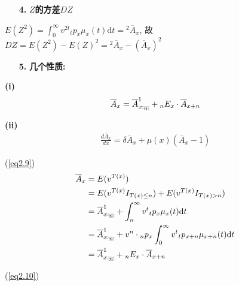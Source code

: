 \documentclass[a4paper,10pt]{ctexbook}
\makeatletter
\newcommand{\hei}{\CJKfamily{hei}}      %
\DeclareRobustCommand{\annu}[1]{_{%
    \def\arraystretch{0}%
    \setlength\arraycolsep{1pt}%
    \setlength\arrayrulewidth{.2pt}%
    \begin{array}[b]{@{}c|}\hline
        \\[\arraycolsep]%
        \scriptstyle #1%
    \end{array}%
}}
\makeatother
\begin{document}
\begin{itemize}
    \item[{\bf\hei 4.}]{\bf\hei $Z$的方差$DZ$}
\end{itemize}

$E(Z^2) = \int_0^\infty v^{2t}{}_tp_x\mu_x(t)\mathrm{d}t = {}^2\overline{A}_x$, 故
$
    DZ = E(Z^2) - E(Z)^2 = {}^2\overline{A}_x - (\overline{A}_x)^2
$

\begin{itemize}
    \item[{\bf\hei 5.}]{\bf\hei 几个性质: }
\end{itemize}

{\rm\bf(i)} \begin{align}\label{eq2.9}
    \overline{A}_x = \overline{A}_{x:\annu{n}}^1 + {}_nE_{x}\cdot \overline{A}_{x+n}\end{align}

{\rm\bf(ii)} \begin{align}\label{eq2.10}
    \frac{d\overline{A}_x}{dx} = \delta \overline{A}_x + \mu(x)(\overline{A}_x - 1)\end{align}

\proof (\ref{eq2.9})
\begin{align*}
    \overline{A}_x & = E(v^{T(x)})                                                                                           \\
                   & = E(v^{T(x)}I_{T(x)\leq n}) + E(v^{T(x)}I_{T(x)> n})                                                    \\
                   & = \overline{A}_{x:\annu{n}}^1 + \int_n^\infty v^t{}_tp_x\mu_x(t)\mathrm{d}t                             \\
                   & = \overline{A}_{x:\annu{n}}^1 + v^n\cdot {}_np_x\int_0^\infty v^{t}{}_{t}p_{x+n}\mu_{x+n}(t)\mathrm{d}t \\
                   & = \overline{A}_{x:\annu{n}}^1 + {}_nE_{x}\cdot \overline{A}_{x+n}
\end{align*}

(\ref{eq2.10})
\end{document}
